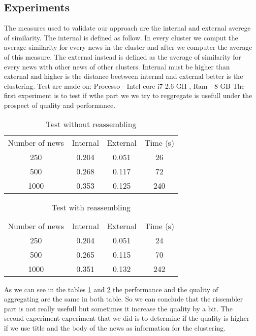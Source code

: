 \documentclass{acm_proc_article-sp}
\begin{document}
\subsection{Experiments}
The measures used to validate our approach are the internal and external averege of similarity. The internal is defined as follow. In every cluster we comput the average similarity for every news in the cluster and after we computer the average of this measure. The external instead is defined as the average of similarity for every news with other news of other clusters. Internal must be higher than external and  higher is the distance beetween internal and external better is the clustering.
Test are made on: Processo - Intel core i7 2.6 GH , Ram - 8 GB
The first experiment is to test if wthe part we we try to reggregate is usefull under the prospect of quality and performance.
\begin{table}[!ht]
\centering
\label{table:norea}
\begin{tabular}{cccc}
Number of news & Internal & External & Time (s) \\
250            & 0.204    & 0.051    & 26       \\
500            & 0.268    & 0.117    & 72       \\
1000           & 0.353    & 0.125    & 240      \\ 
\end{tabular}
\caption{Test without reassembling}
\end{table}

\begin{table}[!ht]
\centering
\label{table:sirea}
\begin{tabular}{cccc}
Number of news & Internal & External & Time (s) \\
250            & 0.204    & 0.051    & 24       \\
500            & 0.265    & 0.115    & 70       \\
1000           & 0.351    & 0.132    & 242     
\end{tabular}
\caption{Test with reassembling}
\end{table}

As we can see in the tables \ref{table:norea} and \ref{table:sirea} the performance and the quality of aggregating are the same in both table. So we can conclude that the rissembler part is not really usefull but sometimes it increase the quality by a bit.
The second experiment experiment that we did is to determine if the quality is higher if we use title and the body of the news as information for the clustering.
\end{document}
